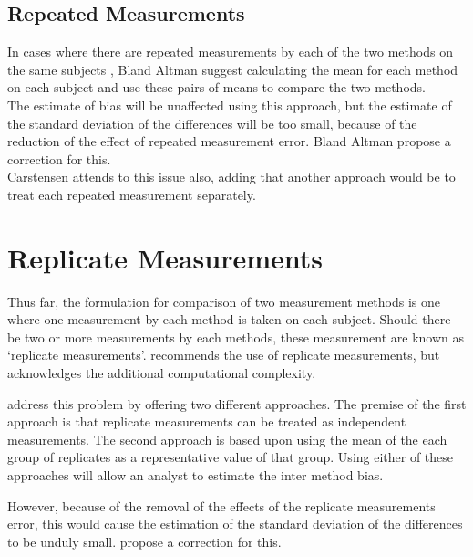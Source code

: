 \documentclass[MAIN.tex]{subfiles}
\begin{document}
	
	
\subsection{Repeated Measurements }
In cases where there are repeated measurements by each of the two methods on the same subjects , Bland Altman suggest calculating the mean for each method on each subject and use these pairs of	means to compare the two methods.
	\\
The estimate of bias will be unaffected using this approach, but the estimate of the standard deviation of the differences will be too small, because of the reduction of the effect of repeated measurement error. Bland Altman propose a correction for this.
	\\
Carstensen attends to this issue also, adding that another approach would be to treat each repeated measurement separately.
	
	
	


\section{Replicate Measurements}

Thus far, the formulation for comparison of two measurement
methods is one where one measurement by each method is taken on
each subject. Should there be two or more measurements by each
methods, these measurement are known as `replicate measurements'.
\citet{BXC2008} recommends the use of replicate measurements, but
acknowledges the additional computational complexity.

\citet*{BA86} address this problem by offering two different
approaches. The premise of the first approach is that replicate
measurements can be treated as independent measurements. The
second approach is based upon using the mean of the each group of
replicates as a representative value of that group. Using either
of these approaches will allow an analyst to estimate the inter
method bias.


However, because of the removal of the effects of the replicate
measurements error, this would cause the estimation of the
standard deviation of the differences to be unduly small.
\citet*{BA86} propose a correction for this.
\end{document}
